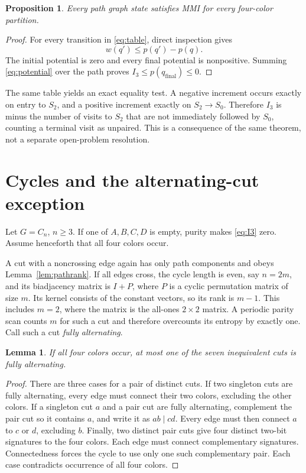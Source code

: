 \documentclass[11pt,letterpaper]{article}
\newtheorem{lemma}[theorem]{Lemma}
\newtheorem{proposition}[theorem]{Proposition}
\newcommand{\Ithree}{I_3}
\begin{document}
\begin{proposition}\label{prop:path}
Every path graph state satisfies MMI for every four-color partition.
\end{proposition}
\begin{proof}
For every transition in \eqref{eq:table}, direct inspection gives
\begin{equation}\label{eq:potential}
 w(q')\leq p(q')-p(q).
\end{equation}
The initial potential is zero and every final potential is nonpositive. Summing \eqref{eq:potential} over the path proves $\Ithree\leq p(q_{\mathrm{final}})\leq0$.
\end{proof}

The same table yields an exact equality test. A negative increment occurs exactly on entry to $S_2$, and a positive increment exactly on $S_2\to S_0$. Therefore $\Ithree$ is minus the number of visits to $S_2$ that are not immediately followed by $S_0$, counting a terminal visit as unpaired. This is a consequence of the same theorem, not a separate open-problem resolution.

\section{Cycles and the alternating-cut exception}
Let $G=C_n$, $n\geq3$. If one of $A,B,C,D$ is empty, purity makes \eqref{eq:I3} zero. Assume henceforth that all four colors occur.

A cut with a noncrossing edge again has only path components and obeys Lemma~\ref{lem:pathrank}. If all edges cross, the cycle length is even, say $n=2m$, and its biadjacency matrix is $I+P$, where $P$ is a cyclic permutation matrix of size $m$. Its kernel consists of the constant vectors, so its rank is $m-1$. This includes $m=2$, where the matrix is the all-ones $2\times2$ matrix. A periodic parity scan counts $m$ for such a cut and therefore overcounts its entropy by exactly one. Call such a cut \emph{fully alternating}.

\begin{lemma}\label{lem:onecut}
If all four colors occur, at most one of the seven inequivalent cuts is fully alternating.
\end{lemma}
\begin{proof}
There are three cases for a pair of distinct cuts. If two singleton cuts are fully alternating, every edge must connect their two colors, excluding the other colors. If a singleton cut $a$ and a pair cut are fully alternating, complement the pair cut so it contains $a$, and write it as $ab\mid cd$. Every edge must then connect $a$ to $c$ or $d$, excluding $b$. Finally, two distinct pair cuts give four distinct two-bit signatures to the four colors. Each edge must connect complementary signatures. Connectedness forces the cycle to use only one such complementary pair. Each case contradicts occurrence of all four colors.
\end{proof}
\end{document}
